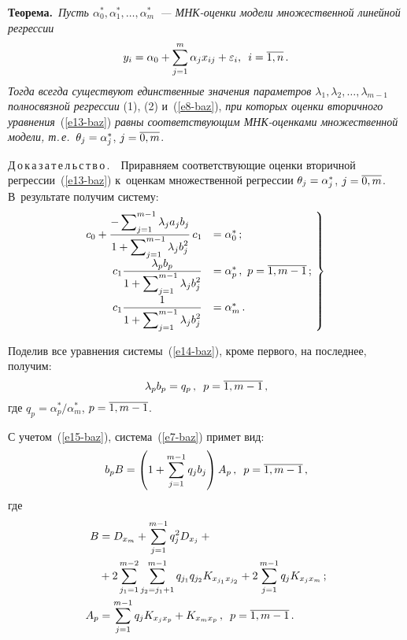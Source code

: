 \begin{multicols}{2}
    \smallskip
    
    \noindent
    \textbf{Теорема.}\ \textit{Пусть $\alpha_0^*, \alpha_1^*,\ldots , 
\alpha_m^*$~--- 
 МНК-оцен\-ки модели множественной линейной регрессии
 $$
 y_i= 
\alpha_0+ \sum\limits^m_{j=1} \alpha_j x_{ij} + \varepsilon_i,\enskip
i=  \overline{1,n}\,.
$$ 
Тогда всегда существуют единственные значения параметров 
$\lambda_1, \lambda_2, \ldots ,  
\lambda_{m-1}$ полносвязной регрессии} (1), (2) и~(\ref{e8-baz}), \textit{при 
которых оценки вторичного уравнения}~(\ref{e13-baz}) \textit{равны 
соответствующим МНК-оцен\-ка\-ми множественной модели, т.\,е.}\ 
$\theta_j\hm= \alpha_j^*$, $j\hm=\overline{0,m}$.
    
    \smallskip
    
    \noindent
    Д\,о\,к\,а\,з\,а\,т\,е\,л\,ь\,с\,т\,в\,о\,.\ \ Приравняем со\-от\-вет\-ст\-ву\-ющие 
оценки вторичной регрессии~(\ref{e13-baz}) к~оценкам множественной регрессии 
$\theta_j\hm= \alpha_j^*$, $j\hm= \overline{0,m}$. В~результате получим 
систему:
    \begin{equation}
    \left.
    \begin{array}{rl}
   \hspace*{-3mm}c_0+\displaystyle \fr{-\sum\nolimits_{j=1}^{m-1} \lambda_j a_j b_j} 
{1+\sum\nolimits_{j=1}^{m-1} \lambda_j b_j^2}\,c_1&=\alpha_0^*\,;\\[6pt]
    \hspace*{-3mm}c_1\displaystyle \fr{\lambda_p b_p}{1+\sum\nolimits_{j=1}^{m-1} \lambda_j 
b_j^2}&=\alpha_p^*\,,\ p=\overline{1,m-1}\,;\\[6pt]
    \hspace*{-3mm}c_1\displaystyle \fr{1}{1+\sum\nolimits_{j=1}^{m-1} \lambda_j 
b_j^2}&=\alpha_m^*\,.
    \end{array}
\!    \right\}\!
    \label{e14-baz}
    \end{equation}
    
    Поделив все уравнения системы~(\ref{e14-baz}), кроме первого, на 
последнее, получим:
    \begin{equation}
    \lambda_p b_p=q_p\,,\enskip p=\overline{1,m-1}\,,
    \label{e15-baz}
    \end{equation}
где $q_p=\alpha_p^*/\alpha_m^*$, $p\hm= \overline{1,m-1}$.
    
    С учетом~(\ref{e15-baz}), система~(\ref{e7-baz}) примет вид:
    \begin{equation}
    b_p B = \left( 1+\sum\limits_{j=1}^{m-1} q_j b_j\right) A_p\,,\enskip  
p=\overline{1,m-1}\,,
    \label{e16-baz}
    \end{equation}
где 
\begin{align*}
B&=D_{x_m}+\sum\limits_{j=1}^{m-1}q_j^2 D_{x_j}+ {}\\
&+2\sum\limits^{m-2}_{j_1=1} 
\sum\limits^{m-1}_{j_2=j_1+1} q_{j_1} q_{j_2} K_{x_{j_1}x_{j_2}} +  
2\sum\limits^{m-1}_{j=1} q_j K_{x_j x_m}\,;\\
A_p&= \sum\limits_{j=1}^{m-1} q_j K_{x_j x_p}+K_{x_m x_p}\,,\enskip 
p=\overline{1,m-1}\,.
\end{align*} 


\end{multicols}
